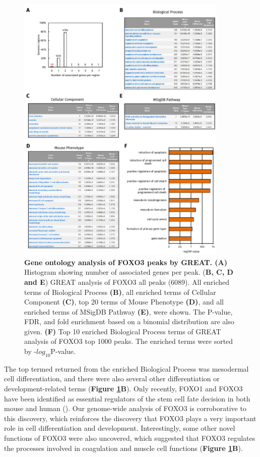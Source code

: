 \begin{figure}[!h]
    \centering
    \includegraphics[width=0.9\textwidth]{chapter3/figures_foxo3/fig41.pdf}
    \caption[Gene ontology analysis of FOXO3 peaks by GREAT]{\textbf{Gene ontology analysis of FOXO3 peaks by GREAT. (A)} Histogram showing number of associated genes per peak. (\textbf{B, C, D and E}) GREAT analysis of FOXO3 all peaks (6089). All enriched terms of Biological Process \textbf{(B)}, all enriched terms of Cellular Component \textbf{(C)}, top 20 terms of Mouse Phenotype \textbf{(D)}, and all enriched terms of MSigDB Pathway \textbf{(E)}, were shown. The P-value, FDR, and fold enrichment based on a binomial distribution are also given. \textbf{(F)} Top 10 enriched Biological Process terms of GREAT analysis of FOXO3 top 1000 peaks. The enriched terms were sorted by -$log_{10}$P-value.}
    \label{fig:fig41}
\end{figure}

The top termed returned from the enriched Biological Process was mesodermal cell differentiation, and there were also several other differentiation or development-related terms (\textbf{Figure \ref{fig:fig41}B}). Only recently, FOXO1 and FOXO3 have been identified as essential regulators of the stem cell fate decision in both mouse and human (\cite{renault2009foxo3,zhang2011foxo1}). Our genome-wide analysis of FOXO3 is corroborative to this discovery, which reinforces the discovery that FOXO3 plays a very important role in cell differentiation and development. Interestingly, some other novel functions of FOXO3 were also uncovered, which suggested that FOXO3 regulates the processes involved in coagulation and muscle cell functions (\textbf{Figure \ref{fig:fig41}B}).

